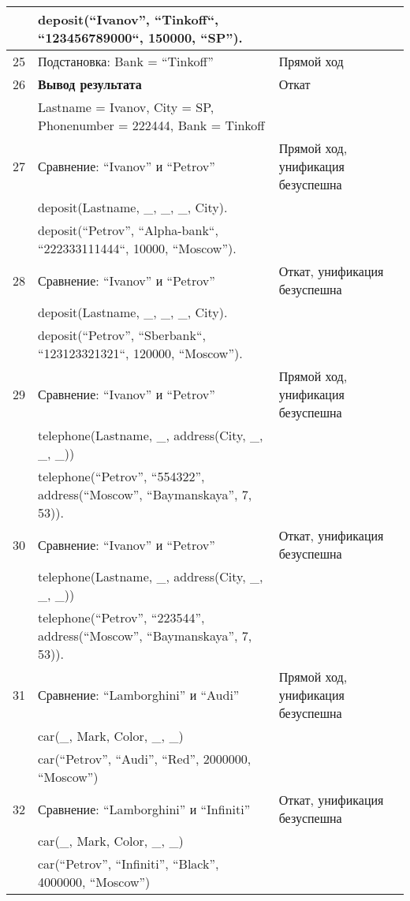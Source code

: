 {\begin{longtable}{|p{1.15cm}|p{8cm}|p{8cm}|}
       & deposit(``Ivanov'', ``Tinkoff``, ``123456789000``, 150000, ``SP''). & \\
    \hline
    25 & Подстановка: Bank = ``Tinkoff'' & Прямой ход \\
    \hline
    26 & \textbf{Вывод результата} & Откат \\
       & Lastname = Ivanov, City = SP, Phonenumber = 222444, Bank = Tinkoff & \\
    \hline
    27 & Сравнение: ``Ivanov'' и ``Petrov'' & Прямой ход, унификация безуспешна \\
       & deposit(Lastname, \_, \_, \_, City). & \\
       & deposit(``Petrov'', ``Alpha-bank``, ``222333111444``, 10000, ``Moscow''). & \\
    \hline
    28 & Сравнение: ``Ivanov'' и ``Petrov'' & Откат, унификация безуспешна \\
       & deposit(Lastname, \_, \_, \_, City). & \\
       & deposit(``Petrov'', ``Sberbank``, ``123123321321``, 120000, ``Moscow''). & \\
    \hline
    29 & Сравнение: ``Ivanov'' и ``Petrov'' & Прямой ход, унификация безуспешна \\
      & telephone(Lastname, \_, address(City, \_, \_, \_)) & \\
      & telephone(``Petrov'', ``554322'', address(``Moscow'', ``Baymanskaya'', 7, 53)). & \\
    \hline
    30 & Сравнение: ``Ivanov'' и ``Petrov'' & Откат, унификация безуспешна \\
      & telephone(Lastname, \_, address(City, \_, \_, \_)) & \\
      & telephone(``Petrov'', ``223544'', address(``Moscow'', ``Baymanskaya'', 7, 53)). & \\
    \hline
    31 & Сравнение: ``Lamborghini'' и ``Audi'' & Прямой ход, унификация безуспешна \\
      & car(\_, Mark, Color, \_, \_) & \\
      & car(``Petrov'', ``Audi'', ``Red'', 2000000, ``Moscow'') & \\
    \hline
    32 & Сравнение: ``Lamborghini'' и ``Infiniti'' & Откат, унификация безуспешна \\
      & car(\_, Mark, Color, \_, \_) & \\
      & car(``Petrov'', ``Infiniti'', ``Black'', 4000000, ``Moscow'') & \\
    \hline
\end{longtable}
}

